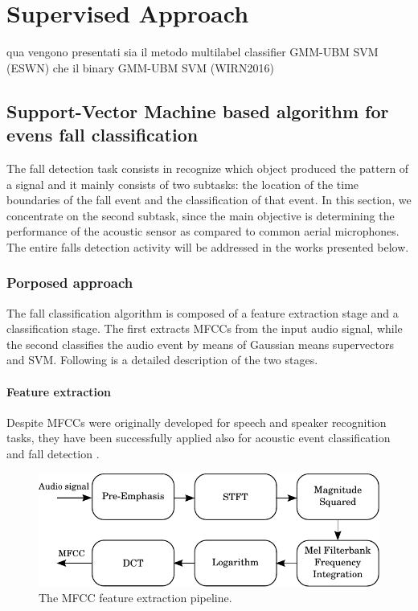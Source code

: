 \chapter{Supervised Approach}
qua vengono presentati sia il metodo multilabel classifier GMM-UBM SVM (ESWN) che 
il binary  GMM-UBM SVM (WIRN2016)



\section{Support-Vector Machine based algorithm for evens fall classification}
\label{sec:algorithm_svm_multiclass}
The fall detection task consists in recognize which object produced the pattern of a signal and it mainly consists of two subtasks: the location of the time boundaries of the fall event and the classification of that event. In this section, we concentrate on the second subtask, since the main objective is determining the performance of the acoustic sensor as compared to common aerial microphones. The entire falls detection activity will be addressed in the works presented below.

\subsection{Porposed approach}
The fall classification algorithm is composed of a feature extraction stage and a classification stage. The first extracts MFCCs from the input audio signal, while the second classifies the audio event by means of Gaussian means supervectors and SVM. Following is a detailed description of the two stages.

\subsubsection{Feature extraction}\label{ssec:fx}
Despite MFCCs were originally developed for speech and speaker recognition tasks, they have been successfully applied also for acoustic event classification \cite{Temko2009} and fall detection \cite{zigel2009method}.

\begin{figure}[b]
	\centering
	\includegraphics[width=0.75\columnwidth]{img/mfcc_bn.pdf}
	\caption{The MFCC feature extraction pipeline.} \label{fig:mfcc}
\end{figure}

